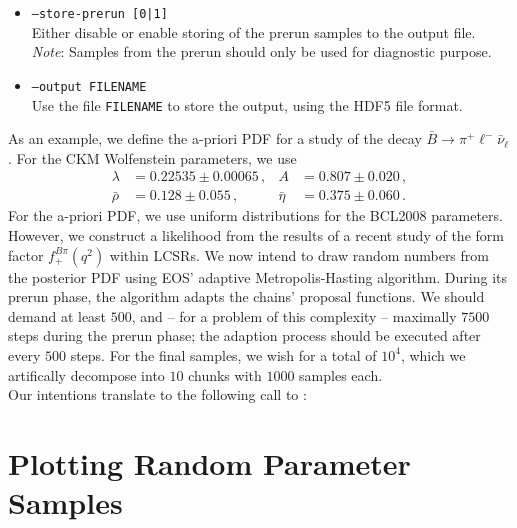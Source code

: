 \begin{itemize}
    \item[] \texttt{--store-prerun [0|1]}\\[\medskipamount]
        Either disable or enable storing of the prerun samples to the output file.\\

        \emph{Note}: Samples from the prerun should only be used for diagnostic purpose.

    \item[] \texttt{--output FILENAME}\\[\medskipamount]
        Use the file \texttt{FILENAME} to store the output, using the HDF5 file format.
\end{itemize}

As an example, we define the a-priori \gls{PDF} for a study of the decay $\bar{B}\to \pi^+\ell^-\bar\nu_\ell$.
For the CKM Wolfenstein parameters, we use
\begin{equation*}
\begin{aligned}
    \lambda    & = 0.22535 \pm 0.00065\,,  &
    A          & = 0.807 \pm 0.020\,,      \\
    \bar{\rho} & = 0.128 \pm 0.055\,,      &
    \bar{\eta} & = 0.375 \pm 0.060\,.
\end{aligned}
\end{equation*}
For the a-priori \gls{PDF}, we use uniform distributions for the BCL2008 \cite{Bourrely:2008za}
parameters. However, we construct a likelihood from the results of a recent study of the form factor
$f^{B\pi}_+(q^2)$ within \glspl{LCSR}. 
We now intend to draw random numbers from the posterior PDF using EOS' adaptive Metropolis-Hasting algorithm.
During its prerun phase, the algorithm adapts the chains' proposal
functions. We should demand at least $500$, and -- for a problem of this complexity -- maximally
$7500$ steps during the prerun phase; the adaption process should be executed
after every $500$ steps. For the final samples, we wish for a total of $10^4$, which we artifically decompose
into $10$ chunks with $1000$ samples each.\\

Our intentions translate to the following call to :

\section{Plotting Random Parameter Samples}
\label{sec:usage:eos-plot}

